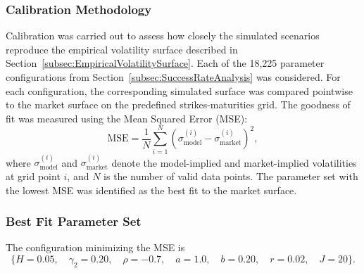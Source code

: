 \subsubsection*{Calibration Methodology}
Calibration was carried out to assess how closely the simulated scenarios reproduce the empirical volatility surface described in Section~\ref{subsec:EmpiricalVolatilitySurface}. Each of the 18{,}225 parameter configurations from Section~\ref{subsec:SuccessRateAnalysis} was considered. For each configuration, the corresponding simulated surface was compared pointwise to the market surface on the predefined strikes-maturities grid. The goodness of fit was measured using the Mean Squared Error (MSE):
\begin{equation}
    \text{MSE} = \frac{1}{N} \sum_{i=1}^{N} \left( \sigma_{\text{model}}^{(i)} - \sigma_{\text{market}}^{(i)} \right)^2,
\end{equation}
where $\sigma_{\text{model}}^{(i)}$ and $\sigma_{\text{market}}^{(i)}$ denote the model-implied and market-implied volatilities at grid point $i$, and $N$ is the number of valid data points.  
The parameter set with the lowest MSE was identified as the best fit to the market surface.

\subsubsection*{Best Fit Parameter Set}
The configuration minimizing the MSE is
\begin{equation*}
    \{ H = 0.05,\quad \gamma_2 = 0.20,\quad \rho = -0.7,\quad a = 1.0,\quad b = 0.20,\quad r = 0.02,\quad J = 20 \}.
\end{equation*}

